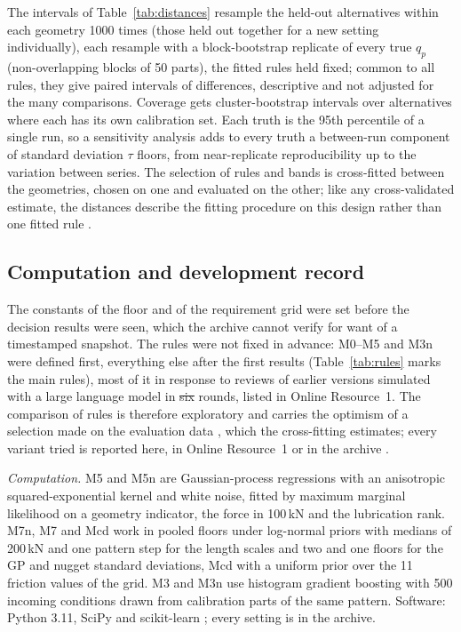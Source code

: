 \documentclass[pdflatex,sn-basic,lineno]{sn-jnl}
\providecommand{\DIFadd}[1]{{\protect\color{blue}\uwave{#1}}} %
\providecommand{\DIFdel}[1]{{\protect\color{red}\sout{#1}}}                      %
\providecommand{\DIFaddbegin}{} %
\providecommand{\DIFaddend}{} %
\providecommand{\DIFdelbegin}{} %
\providecommand{\DIFdelend}{} %
\newcommand{\DIFscaledelfig}{0.5}
\newlength{\DIFdelgraphicswidth} %
\newlength{\DIFdelgraphicsheight} %
\newcommand{\DIFaddincludegraphics}[2][]{{\color{blue}\fbox{\DIFOincludegraphics[#1]{#2}}}} %
\newcommand{\DIFdelincludegraphics}[2][]{%
\sbox{\DIFdelgraphicsbox}{\DIFOincludegraphics[#1]{#2}}%
\settoboxwidth{\DIFdelgraphicswidth}{\DIFdelgraphicsbox} %
\settoboxtotalheight{\DIFdelgraphicsheight}{\DIFdelgraphicsbox} %
\scalebox{\DIFscaledelfig}{%
\parbox[b]{\DIFdelgraphicswidth}{\usebox{\DIFdelgraphicsbox}\\[-\baselineskip] \rule{\DIFdelgraphicswidth}{0em}}\llap{\resizebox{\DIFdelgraphicswidth}{\DIFdelgraphicsheight}{%
\setlength{\unitlength}{\DIFdelgraphicswidth}%
\begin{picture}(1,1)%
\thicklines\linethickness{2pt} %
{\color[rgb]{1,0,0}\put(0,0){\framebox(1,1){}}}%
{\color[rgb]{1,0,0}\put(0,0){\line( 1,1){1}}}%
{\color[rgb]{1,0,0}\put(0,1){\line(1,-1){1}}}%
\end{picture}%
}\hspace*{3pt}}} %
} %
\DeclareRobustCommand{\DIFaddbegin}{\DIFOaddbegin \let\includegraphics\DIFaddincludegraphics} %
\DeclareRobustCommand{\DIFaddend}{\DIFOaddend \let\includegraphics\DIFOincludegraphics} %
\DeclareRobustCommand{\DIFdelbegin}{\DIFOdelbegin \let\includegraphics\DIFdelincludegraphics} %
\DeclareRobustCommand{\DIFdelend}{\DIFOaddend \let\includegraphics\DIFOincludegraphics} %
\begin{document}
The intervals of Table~\ref{tab:distances} resample the held-out alternatives within each geometry 1000 times (those held out together for a new setting individually), each resample with a block-bootstrap replicate of every true $q_p$ (non-overlapping blocks of 50 parts), the fitted rules held fixed; common to all rules, they give paired intervals of differences, descriptive and not adjusted for the many comparisons. Coverage gets cluster-bootstrap intervals over alternatives where each has its own calibration set. Each truth is the 95th percentile of a single run, so a sensitivity analysis adds to every truth a between-run component of standard deviation $\tau$ floors, from near-replicate reproducibility up to the variation between series. The selection of rules and bands is cross-fitted between the geometries, chosen on one and evaluated on the other; like any cross-validated estimate, the distances describe the fitting procedure on this design rather than one fitted rule \citep{bates2024cross}.

\subsection{Computation and development record}\label{sec:computation}

The constants of the floor and of the requirement grid were set before the decision results were seen, which the archive cannot verify for want of a timestamped snapshot. The rules were not fixed in advance: M0--M5 and M3n were defined first, everything else after the first results (Table~\ref{tab:rules} marks the main rules), most of it in response to reviews of earlier versions simulated with a large language model in \DIFdelbegin \DIFdel{six }\DIFdelend \DIFaddbegin \DIFadd{seven }\DIFaddend rounds, listed in Online Resource~1. The comparison of rules is therefore exploratory and carries the optimism of a selection made on the evaluation data \citep{cawley2010over, varma2006bias}, which the cross-fitting estimates; every variant tried is reported here, in Online Resource~1 or in the archive \citep{canseven2026archive}.

\emph{Computation.} M5 and M5n are Gaussian-process regressions with an anisotropic squared-exponential kernel and white noise, fitted by maximum marginal likelihood on a geometry indicator, the force in 100\,kN and the lubrication rank. M7n, M7 and Mcd work in pooled floors under log-normal priors with medians of 200\,kN and one pattern step for the length scales and two and one floors for the GP and nugget standard deviations, Mcd with a uniform prior over the 11 friction values of the grid. M3 and M3n use histogram gradient boosting with 500 incoming conditions drawn from calibration parts of the same pattern. Software: Python 3.11, SciPy and scikit-learn \citep{pedregosa2011scikit}; every setting is in the archive.
\end{document}
